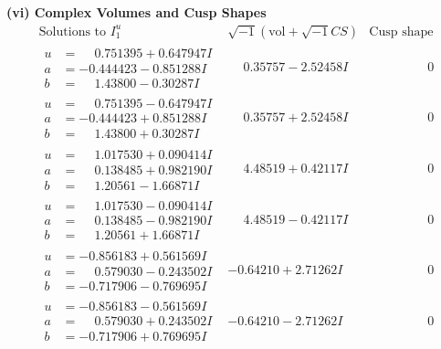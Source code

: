 \documentclass[1p]{elsarticle_modified}
\theoremstyle{definition}
\newcommand{\I}{\sqrt{-1}}
\begin{document}
\newpage\flushleft \textbf{(vi) Complex Volumes and Cusp Shapes}
$$\begin{array}{c|c|c}  
\text{Solutions to }I^u_{1}& \I (\text{vol} + \sqrt{-1}CS) & \text{Cusp shape}\\
 \hline 
\begin{aligned}
u &= \phantom{-}0.751395 + 0.647947 I \\
a &= -0.444423 - 0.851288 I \\
b &= \phantom{-}1.43800 - 0.30287 I\end{aligned}
 & \phantom{-}0.35757 - 2.52458 I & \phantom{-0.000000 } 0 \\ \hline\begin{aligned}
u &= \phantom{-}0.751395 - 0.647947 I \\
a &= -0.444423 + 0.851288 I \\
b &= \phantom{-}1.43800 + 0.30287 I\end{aligned}
 & \phantom{-}0.35757 + 2.52458 I & \phantom{-0.000000 } 0 \\ \hline\begin{aligned}
u &= \phantom{-}1.017530 + 0.090414 I \\
a &= \phantom{-}0.138485 + 0.982190 I \\
b &= \phantom{-}1.20561 - 1.66871 I\end{aligned}
 & \phantom{-}4.48519 + 0.42117 I & \phantom{-0.000000 } 0 \\ \hline\begin{aligned}
u &= \phantom{-}1.017530 - 0.090414 I \\
a &= \phantom{-}0.138485 - 0.982190 I \\
b &= \phantom{-}1.20561 + 1.66871 I\end{aligned}
 & \phantom{-}4.48519 - 0.42117 I & \phantom{-0.000000 } 0 \\ \hline\begin{aligned}
u &= -0.856183 + 0.561569 I \\
a &= \phantom{-}0.579030 - 0.243502 I \\
b &= -0.717906 - 0.769695 I\end{aligned}
 & -0.64210 + 2.71262 I & \phantom{-0.000000 } 0 \\ \hline\begin{aligned}
u &= -0.856183 - 0.561569 I \\
a &= \phantom{-}0.579030 + 0.243502 I \\
b &= -0.717906 + 0.769695 I\end{aligned}
 & -0.64210 - 2.71262 I & \phantom{-0.000000 } 0 \\ \hline\begin{aligned}

\end{aligned}
\end{array}$$
\end{document}
